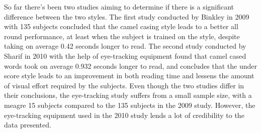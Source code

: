 \iffalse
\begin{itemize}
  \item Have a specific background or spread it out
  \item May be necessary to introduce certain things
  \item From our running example, we might discuss prior work on simplifying parallel programming, or SOTA with e.g., threads
\end{itemize}
\fi


So far there's been two studies aiming to determine if there is a significant difference between the two styles. The first study conducted by Binkley \etal in 2009 \cite{to-camelCase-or-under-score} with 135 subjects concluded that the camel casing style leads to a better all round performance, at least when the subject is trained on the style, despite taking on average 0.42 seconds longer to read. The second study conducted by Sharif \etal in 2010 \cite{eye-tracking-study} with the help of eye-tracking equipment found that camel cased words took on average 0.932 seconds longer to read, and concludes that the under score style leads to an improvement in both reading time and lessens the amount of visual effort required by the subjects. Even though the two studies differ in their conclusions, the eye-tracking study suffers from a small sample size, with a meagre 15 subjects compared to the 135 subjects in the 2009 study. However, the eye-tracking equipment used in the 2010 study lends a lot of credibility to the data presented.
